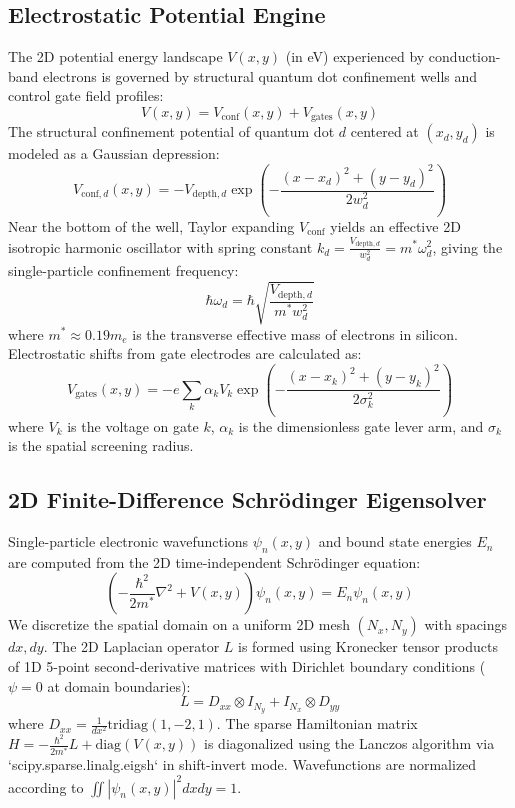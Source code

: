 \documentclass[journal,twocolumn,10pt]{IEEEtran}
\begin{document}
\subsection{Electrostatic Potential Engine}
The 2D potential energy landscape $V(x, y)$ (in eV) experienced by conduction-band electrons is governed by structural quantum dot confinement wells and control gate field profiles:
\begin{equation}
V(x, y) = V_{\text{conf}}(x, y) + V_{\text{gates}}(x, y)
\end{equation}
The structural confinement potential of quantum dot $d$ centered at $(x_d, y_d)$ is modeled as a Gaussian depression:
\begin{equation}
V_{\text{conf}, d}(x, y) = -V_{\text{depth}, d} \exp\left( -\frac{(x - x_d)^2 + (y - y_d)^2}{2 w_d^2} \right)
\end{equation}
Near the bottom of the well, Taylor expanding $V_{\text{conf}}$ yields an effective 2D isotropic harmonic oscillator with spring constant $k_d = \frac{V_{\text{depth}, d}}{w_d^2} = m^* \omega_d^2$, giving the single-particle confinement frequency:
\begin{equation}
\hbar \omega_d = \hbar \sqrt{\frac{V_{\text{depth}, d}}{m^* w_d^2}}
\end{equation}
where $m^* \approx 0.19 m_e$ is the transverse effective mass of electrons in silicon. Electrostatic shifts from gate electrodes are calculated as:
\begin{equation}
V_{\text{gates}}(x, y) = -e \sum_{k} \alpha_k V_k \exp\left( -\frac{(x - x_k)^2 + (y - y_k)^2}{2 \sigma_k^2} \right)
\end{equation}
where $V_k$ is the voltage on gate $k$, $\alpha_k$ is the dimensionless gate lever arm, and $\sigma_k$ is the spatial screening radius.

\subsection{2D Finite-Difference Schrödinger Eigensolver}
Single-particle electronic wavefunctions $\psi_n(x, y)$ and bound state energies $E_n$ are computed from the 2D time-independent Schrödinger equation:
\begin{equation}
\left( -\frac{\hbar^2}{2 m^*} \nabla^2 + V(x, y) \right) \psi_n(x, y) = E_n \psi_n(x, y)
\end{equation}
We discretize the spatial domain on a uniform 2D mesh $(N_x, N_y)$ with spacings $dx, dy$. The 2D Laplacian operator $L$ is formed using Kronecker tensor products of 1D 5-point second-derivative matrices with Dirichlet boundary conditions ($\psi=0$ at domain boundaries):
\begin{equation}
L = D_{xx} \otimes I_{N_y} + I_{N_x} \otimes D_{yy}
\end{equation}
where $D_{xx} = \frac{1}{dx^2}\text{tridiag}(1, -2, 1)$. The sparse Hamiltonian matrix $H = -\frac{\hbar^2}{2 m^*} L + \text{diag}(V(x, y))$ is diagonalized using the Lanczos algorithm via `scipy.sparse.linalg.eigsh` in shift-invert mode. Wavefunctions are normalized according to $\iint |\psi_n(x,y)|^2 dx dy = 1$.
\end{document}
